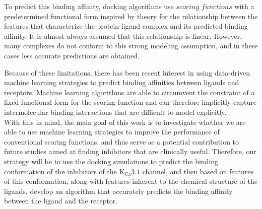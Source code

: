 To predict this binding affinity, docking algorithms use $scoring$ $functions$ with a predetermined functional form inspired by theory for the relationship between the features that characterize the protein-ligand complex and its predicted binding affinity. It is almost always assumed that this relationship is linear. However, many complexes do not conform to this strong modeling assumption, and in these cases less accurate predictions are obtained.

Because of these limitations, there has been recent interest in using data-driven machine learning strategies to predict binding affinities between ligands and receptors. Machine learning algorithms are able to circumvent the constraint of a fixed functional form for the scoring function and can therefore implicitly capture intermolecular binding interactions that are difficult to model explicitly.\\

With this in mind, the main goal of this work is to investigate whether we are able to use machine learning strategies to improve the performance of conventional scoring functions, and thus serve as a potential contribution to future studies aimed at finding inhibitors that are clinically useful. Therefore, our strategy will be to use the docking simulations to predict the binding conformation of the inhibitors of the $\text{K}_{\text{Ca}}3.1$ channel, and then based on features of this conformation, along with features inherent to the chemical structure of the ligands, develop an algorithm that accurately predicts the binding affinity between the ligand and the receptor.